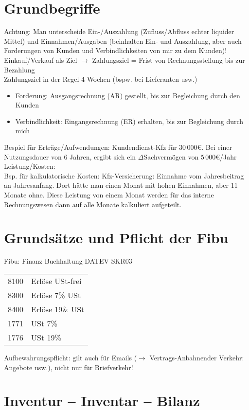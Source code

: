\section{Grundbegriffe}
Achtung: Man unterscheide Ein-/Auszahlung (Zufluss/Abfluss echter liquider Mittel) und Einnahmen/Ausgaben (beinhalten Ein- und Auszahlung, aber auch Forderungen von Kunden und Verbindlichkeiten von mir zu dem Kunden)!\medskip\\
Einkauf/Verkauf als Ziel $\to$ Zahlungsziel = Frist von Rechnungsstellung bis zur Bezahlung\\
Zahlungsziel in der Regel 4 Wochen (bspw. bei Lieferanten usw.)
\begin{itemize}
\item Forderung: Ausgangsrechnung (AR) gestellt, bis zur Begleichung durch den Kunden
\item Verbindlichkeit: Eingangsrechnung (ER) erhalten, bis zur Begleichung durch mich
\end{itemize}
Bespiel für Erträge/Aufwendungen: Kundendienst-Kfz für $30\,000$\euro{}. Bei einer Nutzungsdauer von 6 Jahren, ergibt sich ein $\Delta$Sachvermögen von $5\,000$\euro{}/Jahr\bigskip\\
Leistung/Kosten: \\
Bsp. für kalkulatorische Kosten: Kfz-Versicherung: Einnahme vom Jahresbeitrag an Jahresanfang. Dort hätte man einen Monat mit hohen Einnahmen, aber 11 Monate ohne. Diese Leistung von einem Monat werden für das interne Rechnungswesen dann auf alle Monate kalkuliert aufgeteilt.
\section{Grundsätze und Pflicht der Fibu}
Fibu: Finanz Buchhaltung
DATEV SKR03\\
\begin{tabular}{l l}
8100 & Erlöse USt-frei\\
8300 & Erlöse 7\% USt\\
8400 & Erlöse 19\& USt\\
\hline
1771 & USt 7\%\\
1776 & USt 19\%
\end{tabular}
Aufbewahrungspflicht: gilt auch für Emails ($\to$ Vertrags-Anbahnender Verkehr: Angebote usw.), nicht nur für Briefverkehr!

\section{Inventur -- Inventar -- Bilanz}
